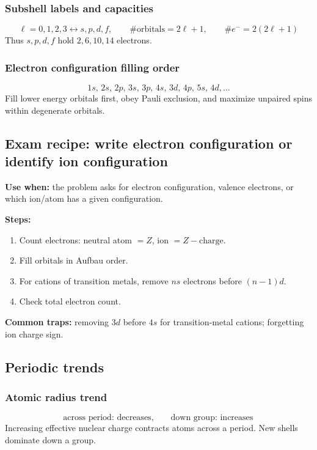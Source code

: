 \subsubsection{Subshell labels and capacities}
\[
\ell=0,1,2,3\leftrightarrow s,p,d,f, \qquad
\#\text{orbitals}=2\ell+1, \qquad
\#e^-=2(2\ell+1)
\]
Thus \(s,p,d,f\) hold \(2,6,10,14\) electrons.

\subsubsection{Electron configuration filling order}
\[
1s,\,2s,\,2p,\,3s,\,3p,\,4s,\,3d,\,4p,\,5s,\,4d,\ldots
\]
Fill lower energy orbitals first, obey Pauli exclusion, and maximize unpaired spins within degenerate orbitals.

\subsection{Exam recipe: write electron configuration or identify ion configuration}
\textbf{Use when:} the problem asks for electron configuration, valence electrons, or which ion/atom has a given configuration.

\textbf{Steps:}
\begin{enumerate}
    \item Count electrons: neutral atom \(=Z\), ion \(=Z-\text{charge}\).
    \item Fill orbitals in Aufbau order.
    \item For cations of transition metals, remove \(ns\) electrons before \((n-1)d\).
    \item Check total electron count.
\end{enumerate}

\textbf{Common traps:} removing \(3d\) before \(4s\) for transition-metal cations; forgetting ion charge sign.

\subsection{Periodic trends}

\subsubsection{Atomic radius trend}
\[
\text{across period: decreases}, \qquad \text{down group: increases}
\]
Increasing effective nuclear charge contracts atoms across a period. New shells dominate down a group.

